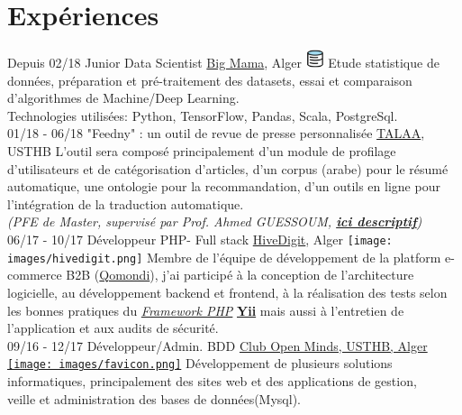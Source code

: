 \documentclass[]{friggeri-cv}
\begin{document}
\section{Expériences}
\begin{entrylist}
  \entry
    {Depuis 02/18}
    {Junior Data Scientist}
    {\href{http://big-mama.io/}{Big Mama}, Alger \includegraphics[width=15pt]{images/bigmama.png} }
    {Etude statistique de données, préparation et pré-traitement des datasets, essai et comparaison d'algorithmes de Machine/Deep Learning.\\
    Technologies utilisées: Python, TensorFlow, Pandas, Scala, PostgreSql.\\}
  \entry
    {01/18 - 06/18}
    {"Feedny" : un outil de revue de presse personnalisée}
    {\href{http://lria.usthb.dz/TALAATeam/People.php}{TALAA}, USTHB }
    {L'outil sera composé principalement d'un module de profilage d'utilisateurs et de catégorisation d'articles, d'un corpus (arabe) pour le résumé automatique, une ontologie pour la recommandation, d'un outils en ligne pour l’intégration de la traduction automatique.\\\emph{(PFE de Master, supervisé par Prof. Ahmed GUESSOUM, \href{http://www.abafann.com/said_pfe.pdf}{\textbf{ici descriptif}})}\\}
  \entry
    {06/17 - 10/17}
    {Développeur PHP- Full stack}
    {\href{http://www.hivedigit.com/}{HiveDigit}, Alger \texttt{[image: images/hivedigit.png]} }
    {Membre de l'équipe de développement de la platform e-commerce B2B (\href{http://www.demo.b2b-dz.com/}{Qomondi}), j'ai participé à la conception de l'architecture logicielle, au développement backend et frontend, à la réalisation des tests selon les bonnes pratiques du \href{https://fr.wikipedia.org/wiki/Liste_de_frameworks_PHP}{\emph{Framework PHP}} \href{http://www.yiiframework.com/}{\textbf{Yii}} mais aussi à l'entretien de l'application et aux audits de sécurité.\\}
  \entry
    {09/16 - 12/17}
    {Développeur/Admin. BDD}
    {\href{http://www.openmindsclub.net/}{Club Open Minds, USTHB, Alger \texttt{[image: images/favicon.png]}}}
    {Développement de plusieurs solutions informatiques, principalement des sites web et des applications de gestion,\\veille et administration des bases de données(Mysql).\\}

\end{entrylist}
\end{document}
